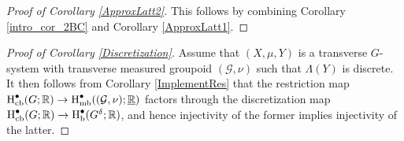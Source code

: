 \documentclass[11pt, oneside]{amsart}
\theoremstyle{definition}
\theoremstyle{remark}
\theoremstyle{TheoremNum}
\newcommand{\Hb}{\textup{H}_{\textup{b}}}
\newcommand{\Hmb}{\textup{H}_{\textup{mb}}}
\newcommand{\Hcb}{\textup{H}_{\textup{cb}}}
\newcommand{\cG}{\mathcal{G}}
\newcommand{\bR}{\mathbb{R}}
\begin{document}
\begin{proof}[Proof of Corollary \ref{ApproxLatt2}] This follows by combining Corollary \ref{intro_cor_2BC} and Corollary \ref{ApproxLatt1}.
\end{proof}
\begin{proof}[Proof of Corollary \ref{Discretization}] 
Assume that $(X,\mu, Y)$ is a transverse $G$-system with transverse measured groupoid $(\cG, \nu)$ such that $\Lambda(Y)$ is discrete. It then follows from Corollary \ref{ImplementRes} that the restriction map $\Hcb^{\bullet}(G; \bR) \to \Hmb^{\bullet}((\cG, \nu); \underline{\bR})$ factors through the discretization map $\Hcb^\bullet(G; \bR) \to \Hb^\bullet(G^\delta; \bR)$, and hence injectivity of the former implies injectivity of the latter.
\end{proof}




  


\end{document}
